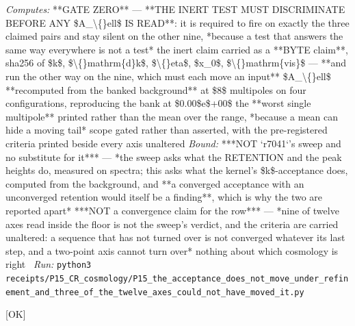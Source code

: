 \begin{description}
\emph{Computes:}  **GATE ZERO** --- **THE INERT TEST MUST DISCRIMINATE BEFORE ANY \$A\_\textbackslash\{\}ell\$ IS READ**: it is required to fire on exactly the three claimed pairs and stay silent on the other nine, *because a test that answers the same way everywhere is not a test*  the inert claim carried as a **BYTE claim**, sha256 of \$k\$, \$\textbackslash\{\}mathrm\{d\}k\$, \$\textbackslash\{\}eta\$, \$x\_0\$, \$\textbackslash\{\}mathrm\{vis\}\$ --- **and run the other way on the nine, which must each move an input**  \$A\_\textbackslash\{\}ell\$ **recomputed from the banked background** at \$8\$ multipoles on four configurations, reproducing the bank at \$0.00\$e\$+00\$  the **worst single multipole** printed rather than the mean over the range, *because a mean can hide a moving tail*  scope gated rather than asserted, with the pre-registered criteria printed beside every axis unaltered
 \emph{Bound:}  ***NOT `r7041`'s sweep and no substitute for it*** --- *the sweep asks what the RETENTION and the peak heights do, measured on spectra; this asks what the kernel's \$k\$-acceptance does, computed from the background, and **a converged acceptance with an unconverged retention would itself be a finding**, which is why the two are reported apart*  ***NOT a convergence claim for the row*** --- *nine of twelve axes read inside the floor is not the sweep's verdict, and the criteria are carried unaltered: a sequence that has not turned over is not converged whatever its last step, and a two-point axis cannot turn over*  nothing about which cosmology is right
\ \emph{Run:} \texttt{python3 receipts/P15\_CR\_cosmology/P15\_the\_acceptance\_does\_not\_move\_under\_refinement\_and\_three\_of\_the\_twelve\_axes\_could\_not\_have\_moved\_it.py}
\item[\rcptlabel{P15_the_band_rms_ratio_does_not_move_with_any_numerical_setting}{P15R222}\textbf{P15R222}\quad\texttt{P15\_the\_band\_rms\_ratio\_does\_not\_move\_with\_any\_numerical\_setting}]\hfill\textsf{[OK]}\\

\end{description}
